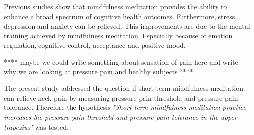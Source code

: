 Previous studies show that mindfulness meditation provides the ability to enhance a broad spectrum of cognitive health outcomes. Furthermore, stress, depression and anxiety can be relieved. This improvements are due to the mental training achieved by mindfulness meditation. Especially because of emotion regulation, cognitive control, acceptance and positive mood. \cite{Zeidan2012,Zeidan2016} 

**** maybe we could write something about sensation of pain here and write why we are looking at pressure pain and healthy subjects ****

The present study addressed the question if short-term mindfulness meditation can relieve neck pain by measuring pressure pain threshold and pressure pain tolerance. Therefore the hypothesis  \textit{"Short-term mindfulness meditation practice increases the pressure pain threshold and pressure pain tolerance in the upper trapezius"} was tested.

